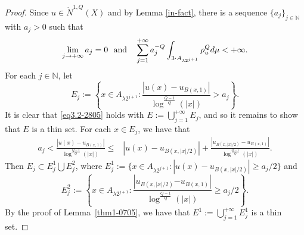 \documentclass[10pt]{amsart}
\numberwithin{equation}{section}
\newcommand{\N}{\mathbb{N}}
\begin{document}
 \begin{proof}
	 Since $u\in \dot N^{1,Q}(X)$ and by Lemma \ref{in-fact}, there is a sequence $\{a_j\}_{j\in\mathbb N}$ with $a_j>0$ such that
 	\begin{equation}\label{eq3.1-1305}
 	\lim_{j\to{+\infty}}a_j=0 \text{\rm \ \ and \ \ } \sum_{j=1}^{+\infty} a_{j}^{-Q}\int_{3\cdot A_{\lambda 2^{j+1}}}\rho_u^Qd\mu<{+\infty}.
 	\end{equation}
	For each $j\in\N$, let 
	\[
			E_j:=\left\{x\in A_{\lambda 2^{j+1}}:\frac{|u(x)-u_{B(x,1)}|
	}{\log^{\frac{Q-1}{Q}}(|x|)}>a_j\right\}.
	\]	
	It is clear that \eqref{eq3.2-2805} holds with $E:=\bigcup_{j=1}^{+\infty} E_j$, and so it remains to show that $E$ is a thin set. 
	For each $x\in E_j$, we have that
	\begin{align*}
	a_j<\frac{|u(x)-u_{B(x,1)}|}{\log^{\frac{Q-1}{Q}}(|x|)}\leq& |u(x)-u_{B(x,|x|/2)}| + \frac{|u_{B(x,|x|/2)}-u_{B(x,1)}|}{\log^{\frac{Q-1}{Q}}(|x|)}.
	\end{align*}
	Then $E_j\subset E_j^1\bigcup E_j^2$, where  $E_j^1:=\{x\in A_{\lambda 2^{j+1}}: |u(x)-u_{B(x,|x|/2)}|\geq a_j/2\}$ and
 \[
 E_j^2:=\left\{x\in A_{\lambda 2^{j+1}}: \frac{|u_{B(x,|x|/2)}{-u_{B(x,1)}}|}{\log^{\frac{Q-1}{Q}}(|x|)}\geq a_j/2 \right\}.
 \] 
 By the proof of Lemma~\ref{thm1-0705}, we have that $E^1:=\bigcup_{j=1}^{+\infty} E_j^1$ is a thin set.
 

\end{proof}
\end{document}
